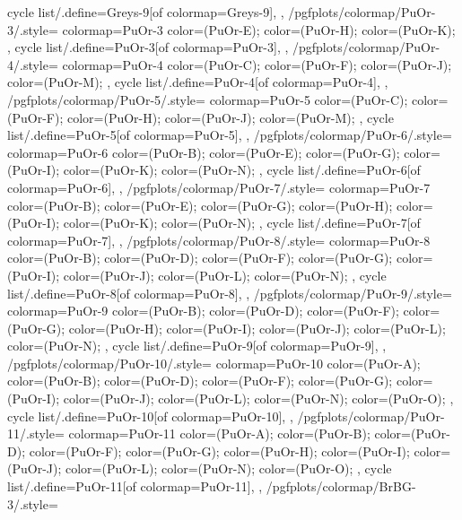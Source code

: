 {{    cycle list/.define={Greys-9}{[of colormap=Greys-9]},
  },
  /pgfplots/colormap/PuOr-3/.style={
    colormap={PuOr-3}{
      color=(PuOr-E);
      color=(PuOr-H);
      color=(PuOr-K);
    },
    cycle list/.define={PuOr-3}{[of colormap=PuOr-3]},
  },
  /pgfplots/colormap/PuOr-4/.style={
    colormap={PuOr-4}{
      color=(PuOr-C);
      color=(PuOr-F);
      color=(PuOr-J);
      color=(PuOr-M);
    },
    cycle list/.define={PuOr-4}{[of colormap=PuOr-4]},
  },
  /pgfplots/colormap/PuOr-5/.style={
    colormap={PuOr-5}{
      color=(PuOr-C);
      color=(PuOr-F);
      color=(PuOr-H);
      color=(PuOr-J);
      color=(PuOr-M);
    },
    cycle list/.define={PuOr-5}{[of colormap=PuOr-5]},
  },
  /pgfplots/colormap/PuOr-6/.style={
    colormap={PuOr-6}{
      color=(PuOr-B);
      color=(PuOr-E);
      color=(PuOr-G);
      color=(PuOr-I);
      color=(PuOr-K);
      color=(PuOr-N);
    },
    cycle list/.define={PuOr-6}{[of colormap=PuOr-6]},
  },
  /pgfplots/colormap/PuOr-7/.style={
    colormap={PuOr-7}{
      color=(PuOr-B);
      color=(PuOr-E);
      color=(PuOr-G);
      color=(PuOr-H);
      color=(PuOr-I);
      color=(PuOr-K);
      color=(PuOr-N);
    },
    cycle list/.define={PuOr-7}{[of colormap=PuOr-7]},
  },
  /pgfplots/colormap/PuOr-8/.style={
    colormap={PuOr-8}{
      color=(PuOr-B);
      color=(PuOr-D);
      color=(PuOr-F);
      color=(PuOr-G);
      color=(PuOr-I);
      color=(PuOr-J);
      color=(PuOr-L);
      color=(PuOr-N);
    },
    cycle list/.define={PuOr-8}{[of colormap=PuOr-8]},
  },
  /pgfplots/colormap/PuOr-9/.style={
    colormap={PuOr-9}{
      color=(PuOr-B);
      color=(PuOr-D);
      color=(PuOr-F);
      color=(PuOr-G);
      color=(PuOr-H);
      color=(PuOr-I);
      color=(PuOr-J);
      color=(PuOr-L);
      color=(PuOr-N);
    },
    cycle list/.define={PuOr-9}{[of colormap=PuOr-9]},
  },
  /pgfplots/colormap/PuOr-10/.style={
    colormap={PuOr-10}{
      color=(PuOr-A);
      color=(PuOr-B);
      color=(PuOr-D);
      color=(PuOr-F);
      color=(PuOr-G);
      color=(PuOr-I);
      color=(PuOr-J);
      color=(PuOr-L);
      color=(PuOr-N);
      color=(PuOr-O);
    },
    cycle list/.define={PuOr-10}{[of colormap=PuOr-10]},
  },
  /pgfplots/colormap/PuOr-11/.style={
    colormap={PuOr-11}{
      color=(PuOr-A);
      color=(PuOr-B);
      color=(PuOr-D);
      color=(PuOr-F);
      color=(PuOr-G);
      color=(PuOr-H);
      color=(PuOr-I);
      color=(PuOr-J);
      color=(PuOr-L);
      color=(PuOr-N);
      color=(PuOr-O);
    },
    cycle list/.define={PuOr-11}{[of colormap=PuOr-11]},
  },
  /pgfplots/colormap/BrBG-3/.style={
}}
